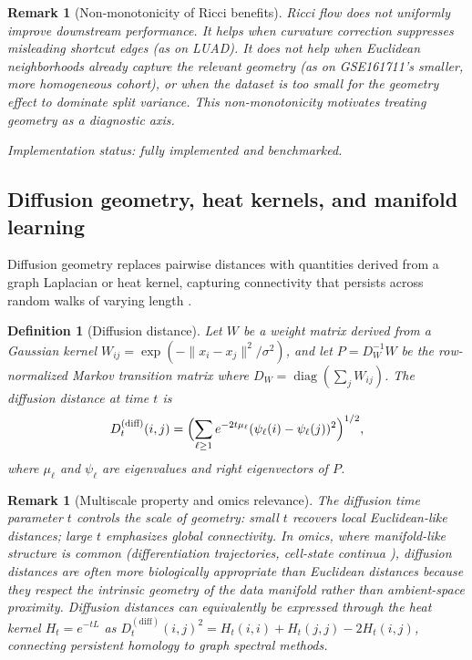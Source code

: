 \documentclass[11pt]{article}
\newtheorem{definition}[theorem]{Definition}
\newtheorem{remark}[theorem]{Remark}
\begin{document}
\begin{remark}[Non-monotonicity of Ricci benefits]\label{rem:ricci_nonmono}
Ricci flow does not uniformly improve downstream performance.
It helps when curvature correction suppresses misleading shortcut edges (as on LUAD).
It does not help when Euclidean neighborhoods already capture the relevant geometry (as on GSE161711's smaller, more homogeneous cohort), or when the dataset is too small for the geometry effect to dominate split variance.
This non-monotonicity motivates treating geometry as a diagnostic axis.
\end{remark}

\emph{Implementation status: fully implemented and benchmarked.}

\subsection{Diffusion geometry, heat kernels, and manifold learning}
\label{sec:diffusion}

Diffusion geometry replaces pairwise distances with quantities derived from a graph Laplacian or heat kernel, capturing connectivity that persists across random walks of varying length \cite{coifman2006diffusion}.

\begin{definition}[Diffusion distance]\label{def:diffusion}
Let $W$ be a weight matrix derived from a Gaussian kernel $W_{ij} = \exp(-\|x_i - x_j\|^2 / \sigma^2)$, and let $P = D_W^{-1} W$ be the row-normalized Markov transition matrix where $D_W = \operatorname{diag}(\sum_j W_{ij})$.
The \emph{diffusion distance} at time $t$ is
\[
D^{(\text{diff})}_{t}(i,j) = \Bigl( \sum_{\ell \ge 1} e^{-2t\mu_\ell} (\psi_\ell(i) - \psi_\ell(j))^2 \Bigr)^{1/2},
\]
where $\mu_\ell$ and $\psi_\ell$ are eigenvalues and right eigenvectors of $P$.
\end{definition}

\begin{remark}[Multiscale property and omics relevance]\label{rem:diffusion_multiscale}
The diffusion time parameter $t$ controls the scale of geometry: small $t$ recovers local Euclidean-like distances; large $t$ emphasizes global connectivity.
In omics, where manifold-like structure is common (differentiation trajectories, cell-state continua \cite{haghverdi2016}), diffusion distances are often more biologically appropriate than Euclidean distances because they respect the intrinsic geometry of the data manifold rather than ambient-space proximity.
Diffusion distances can equivalently be expressed through the heat kernel $H_t = e^{-tL}$ as $D^{(\text{diff})}_t(i,j)^2 = H_t(i,i) + H_t(j,j) - 2H_t(i,j)$, connecting persistent homology to graph spectral methods.
\end{remark}
\end{document}
